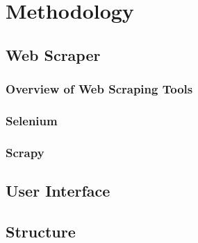\documentclass[main]{subfiles}
\begin{document}
\section{Methodology}

\subsection{Web Scraper}


\subsubsection{Overview of Web Scraping Tools}

\subsubsection{Selenium}

\subsubsection{Scrapy}




\subsection{User Interface}


\subsection{Structure}
\end{document}
